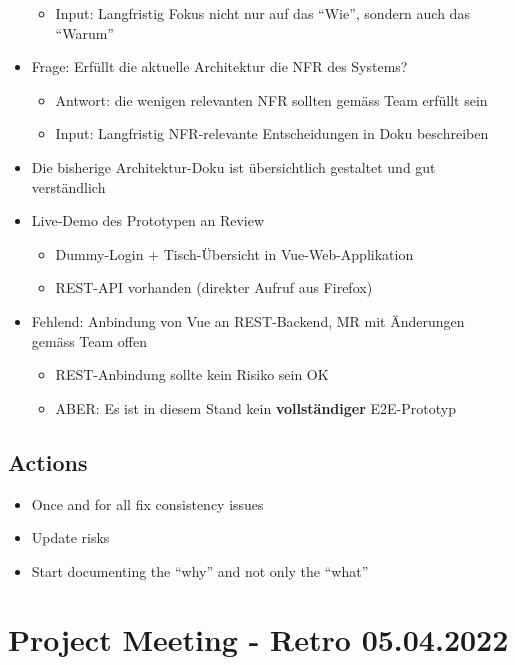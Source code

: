 \begin{itemize}
\begin{itemize}
        \item Input: Langfristig Fokus nicht nur auf das ``Wie'', sondern auch das ``Warum''
    \end{itemize}
    \item Frage: Erfüllt die aktuelle Architektur die NFR des Systems?
    \begin{itemize}
        \item Antwort: die wenigen relevanten NFR sollten gemäss Team erfüllt sein
        \item Input: Langfristig NFR-relevante Entscheidungen in Doku beschreiben
    \end{itemize}
    \item Die bisherige Architektur-Doku ist übersichtlich gestaltet und gut verständlich
    \item Live-Demo des Prototypen an Review
    \begin{itemize}
        \item Dummy-Login + Tisch-Übersicht in Vue-Web-Applikation
        \item REST-API vorhanden (direkter Aufruf aus Firefox)
    \end{itemize}
    \item Fehlend: Anbindung von Vue an REST-Backend, MR mit Änderungen gemäss Team offen
    \begin{itemize}
        \item REST-Anbindung sollte kein Risiko sein \textrightarrow OK
        \item ABER: Es ist in diesem Stand kein \textbf{vollständiger} E2E-Prototyp
    \end{itemize}
\end{itemize}

\subsection{Actions}

\begin{itemize}
    \item Once and for all fix consistency issues
    \item Update risks
    \item Start documenting the ``why'' and not only the ``what''
\end{itemize}


\section{Project Meeting - Retro 05.04.2022}

